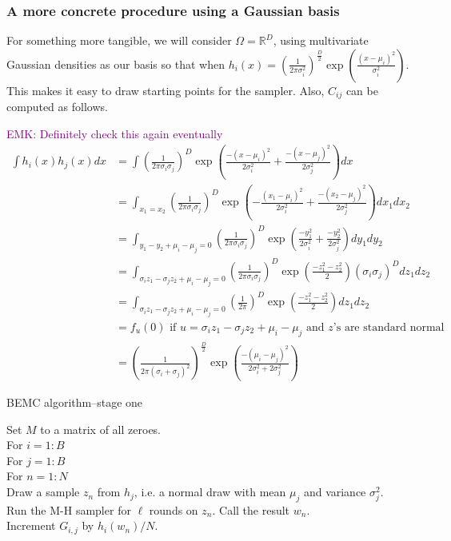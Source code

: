 \documentclass{article}
\newcommand\EMK[1]{\textcolor{purple}{EMK: #1}}
\begin{document}
\subsubsection{A more concrete procedure using a Gaussian basis}
\label{sec: BEMC_concrete}
For something more tangible, we will consider $\Omega=\mathbb{R}^D$, using multivariate Gaussian densities as our basis so that when $h_i(x)= (\frac{1}{2\pi \sigma_i^2})^{\frac{D}{2}}\exp(\frac{(x-\mu_i)^2}{\sigma_i^2})$. This makes it easy to draw starting points for the sampler. Also, $C_{ij}$ can be computed as follows.

\EMK{Definitely check this again eventually}
\begin{align*}
\int h_i(x)h_j(x)dx &=\int (\frac{1}{2\pi \sigma_i\sigma_j})^{D}\exp(\frac{-(x-\mu_i)^2}{2\sigma_i^2}+\frac{-(x-\mu_j)^2}{2\sigma_j^2})dx\\
&=\int_{x_1=x_2} (\frac{1}{2\pi \sigma_i\sigma_j})^{D}\exp(-\frac{(x_1-\mu_i)^2}{2\sigma_i^2}+\frac{-(x_2-\mu_j)^2}{2\sigma_j^2})dx_1dx_2\\
&=\int_{y_1-y_2+\mu_i-\mu_j=0} (\frac{1}{2\pi \sigma_i\sigma_j})^{D}\exp(\frac{-y_1^2}{2\sigma_i^2}+\frac{-y_2^2}{2\sigma_j^2})dy_1dy_2\\
&=\int_{\sigma_iz_1-\sigma_jz_2+\mu_i-\mu_j=0}
 (\frac{1}{2\pi \sigma_i\sigma_j})^{D}
\exp(\frac{-z_1^2-z_2^2}{2})(\sigma_i\sigma_j)^D dz_1dz_2\\
&=\int_{\sigma_iz_1-\sigma_jz_2+\mu_i-\mu_j=0}
 (\frac{1}{2\pi })^{D}
\exp(\frac{-z_1^2-z_2^2}{2}) dz_1dz_2\\
&=f_u(0) \text{ if } u=\sigma_iz_1-\sigma_jz_2+\mu_i-\mu_j \text{ and $z$'s are standard normal}\\
&= (\frac{1}{2\pi (\sigma_i+\sigma_j)^2})^{\frac{D}{2}}\exp(\frac{-(\mu_i-\mu_j)^2}{2\sigma_i^2+2\sigma_j^2})
\end{align*}

\begin{algorithm}[h]
\caption{BEMC algorithm--stage one}
Set $M$ to a matrix of all zeroes.\\
For $i  = 1:B$\\
\Indp
For $j  = 1:B$\\
\Indp
For $n = 1:N$\\
\Indp
Draw a sample $z_n$ from $h_{j}$, i.e. a normal draw with mean $\mu_j$ and variance $\sigma_j^2$.\\
Run the M-H sampler for $\ell$ rounds on $z_n$. Call the result $w_n$.\\
Increment $G_{i, j}$ by $h_{i}(w_n)/N$.\\
\Indm
\Indm
\Indm

\end{algorithm}
\end{document}

